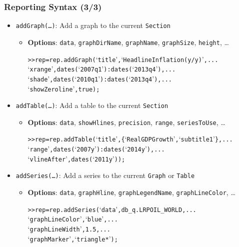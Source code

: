 \documentclass[10pt]{beamer}
\newcommand{\myitem}{\item[$\bullet$]}
\begin{document}
\begin{frame}[fragile,t]
  \frametitle{Reporting Syntax (3/3)}
  \begin{itemize}
    \myitem \texttt{addGraph(\ldots)}: Add a graph to the current \texttt{Section}
    \begin{itemize}
      \myitem \textbf{Options}: \texttt{data}, \texttt{graphDirName}, \texttt{graphName}, \texttt{graphSize}, \texttt{height}, \ldots
      \begin{alltt}
>> rep = rep.addGraph(`title', `Headline Inflation (y/y)', ...
                      `xrange', dates(`2007q1'):dates(`2013q4'), ...
                      `shade', dates(`2010q1'):dates(`2013q4'), ...
                      `showZeroline', true);
      \end{alltt}
    \end{itemize}
    \myitem \texttt{addTable(\ldots)}: Add a table to the current \texttt{Section}
    \begin{itemize}
      \myitem \textbf{Options}: \texttt{data}, \texttt{showHlines}, \texttt{precision}, \texttt{range}, \texttt{seriesToUse}, \ldots
      \begin{alltt}
>> rep = rep.addTable(`title', \{`Real GDP Growth',`subtitle 1'\}, ...
                      `range', dates(`2007y'):dates(`2014y'), ...
                      `vlineAfter', dates(`2011y'));
      \end{alltt}
    \end{itemize}
    \myitem \texttt{addSeries(\ldots)}: Add a series to the current \texttt{Graph} or \texttt{Table}
    \begin{itemize}
      \myitem \textbf{Options}: \texttt{data}, \texttt{graphHline}, \texttt{graphLegendName}, \texttt{graphLineColor}, \ldots
      \begin{alltt}
>> rep = rep.addSeries(`data', db\_q.LRPOIL\_WORLD, ...
                       `graphLineColor', `blue', ...
                       `graphLineWidth', 1.5, ...
                       `graphMarker', `triangle*');
      \end{alltt}
    \end{itemize}
  \end{itemize}
\end{frame}
\end{document}
